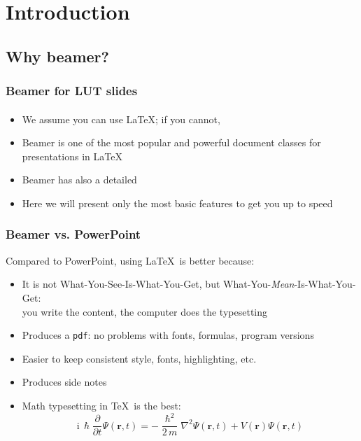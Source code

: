 \documentclass[light]{Theme/lutbeamer} %
\begin{document}
\section{Introduction}
\subsection{Why beamer?}
\begin{frame}
\frametitle{Beamer for LUT slides}
\framesubtitle{}
\begin{itemize}
\item We assume you can use \LaTeX; if you cannot,
\item Beamer is one of the most popular and powerful document classes for presentations in \LaTeX
\item Beamer has also a detailed
\item Here we will present only the most basic features to get you up to speed
\end{itemize}
\end{frame}

\begin{frame}
\frametitle{Beamer vs. PowerPoint}
Compared to PowerPoint, using \LaTeX\ is better because:
\begin{itemize}
\item It is not What-You-See-Is-What-You-Get, but
What-You-\emph{Mean}-Is-What-You-Get:\\
you write the content, the computer does the typesetting
\item Produces a \texttt{pdf}: no problems with fonts, formulas,
      program versions
\item Easier to keep consistent style, fonts, highlighting, etc.
\item Produces side notes
\item Math typesetting in \TeX\ is the best:
\begin{equation*}
\mathrm{i}\,\hslash\frac{\partial}{\partial t} \Psi(\mathbf{r},t) =
-\frac{\hslash^2}{2\,m}\nabla^2\Psi(\mathbf{r},t)
+ V(\mathbf{r})\Psi(\mathbf{r},t)
\end{equation*}

\end{itemize}
\end{frame}
\end{document}
